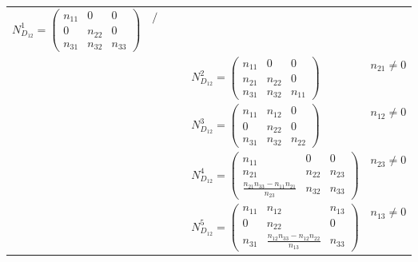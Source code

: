\documentclass[12pt, reqno]{amsart}
\theoremstyle{plain}
\begin{document}
\begin{table}[H]
\begin{tabular}{|c|c|l|c|l|l|}
    $N_{D_{12}}^1 = \begin{pmatrix} n_{11} & 0 & 0 \\ 0 & n_{22} & 0 \\ n_{31} & n_{32} & n_{33} \end{pmatrix}$ & $/$ \\
    & & & & $N_{D_{12}}^2 = \begin{pmatrix} n_{11} & 0 & 0 \\ n_{21} & n_{22} & 0 \\ n_{31} & n_{32} & n_{11} \end{pmatrix}$ & $n_{21} \neq 0$ \\
    & & & & $N_{D_{12}}^3 = \begin{pmatrix} n_{11} & n_{12} & 0 \\ 0 & n_{22} & 0 \\ n_{31} & n_{32} & n_{22} \end{pmatrix}$ & $n_{12} \neq 0$ \\
    & & & & $N_{D_{12}}^4 = \begin{pmatrix} n_{11} & 0 & 0 \\ n_{21} & n_{22} & n_{23} \\ \frac{n_{21}n_{33}-n_{11}n_{21}}{n_{23}} & n_{32} & n_{33} \end{pmatrix}$ & $n_{23} \neq 0$ \\
    & & & & $N_{D_{12}}^5 = \begin{pmatrix} n_{11} & n_{12} & n_{13} \\ 0 & n_{22} & 0 \\ n_{31} & \frac{n_{12}n_{33}-n_{12}n_{22}}{n_{13}} & n_{33} \end{pmatrix}$ & $n_{13} \neq 0$ \\
    \hline
    \end{tabular}
    \label{tab:nijenhuis_3d_associative_D7-D12}
\end{table}
\end{document}
